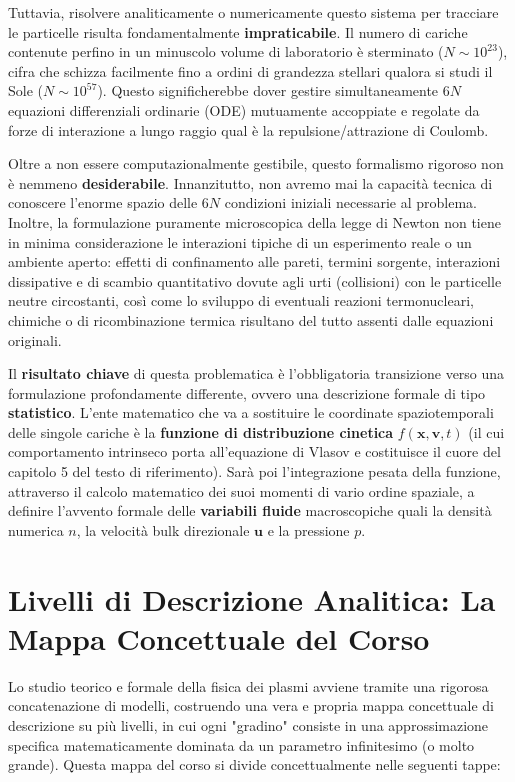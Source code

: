 Tuttavia, risolvere analiticamente o numericamente questo sistema per tracciare le particelle risulta fondamentalmente \textbf{impraticabile}. Il numero di cariche contenute perfino in un minuscolo volume di laboratorio è sterminato ($N \sim 10^{23}$), cifra che schizza facilmente fino a ordini di grandezza stellari qualora si studi il Sole ($N \sim 10^{57}$). Questo significherebbe dover gestire simultaneamente $6N$ equazioni differenziali ordinarie (ODE) mutuamente accoppiate e regolate da forze di interazione a lungo raggio qual è la repulsione/attrazione di Coulomb.

Oltre a non essere computazionalmente gestibile, questo formalismo rigoroso non è nemmeno \textbf{desiderabile}. Innanzitutto, non avremo mai la capacità tecnica di conoscere l'enorme spazio delle $6N$ condizioni iniziali necessarie al problema. Inoltre, la formulazione puramente microscopica della legge di Newton non tiene in minima considerazione le interazioni tipiche di un esperimento reale o un ambiente aperto: effetti di confinamento alle pareti, termini sorgente, interazioni dissipative e di scambio quantitativo dovute agli urti (collisioni) con le particelle neutre circostanti, così come lo sviluppo di eventuali reazioni termonucleari, chimiche o di ricombinazione termica risultano del tutto assenti dalle equazioni originali.

Il \textbf{risultato chiave} di questa problematica è l'obbligatoria transizione verso una formulazione profondamente differente, ovvero una descrizione formale di tipo \textbf{statistico}. L'ente matematico che va a sostituire le coordinate spaziotemporali delle singole cariche è la \textbf{funzione di distribuzione cinetica} $f(\mathbf{x}, \mathbf{v}, t)$ (il cui comportamento intrinseco porta all'equazione di Vlasov e costituisce il cuore del capitolo 5 del testo di riferimento). Sarà poi l'integrazione pesata della funzione, attraverso il calcolo matematico dei suoi momenti di vario ordine spaziale, a definire l'avvento formale delle \textbf{variabili fluide} macroscopiche quali la densità numerica $n$, la velocità bulk direzionale $\mathbf{u}$ e la pressione $p$.

\section{Livelli di Descrizione Analitica: La Mappa Concettuale del Corso}

Lo studio teorico e formale della fisica dei plasmi avviene tramite una rigorosa concatenazione di modelli, costruendo una vera e propria mappa concettuale di descrizione su più livelli, in cui ogni "gradino" consiste in una approssimazione specifica matematicamente dominata da un parametro infinitesimo (o molto grande). Questa mappa del corso si divide concettualmente nelle seguenti tappe:

